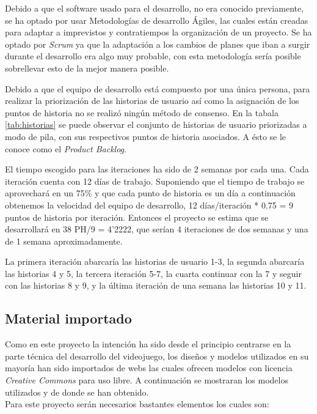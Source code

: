 Debido a que el software usado para el desarrollo, no era conocido previamente, se ha optado por usar Metodologías de desarrollo Ágiles, las cuales están creadas para adaptar a imprevistos y contratiempos la organización de un proyecto. Se ha optado por \textit{Scrum} ya que la adaptación a los cambios de planes que iban a surgir durante el desarrollo era algo muy probable, con esta metodología sería posible sobrellevar esto de la mejor manera posible.

Debido a que el equipo de desarrollo está compuesto por una única persona, para realizar la priorización de las historias de usuario así como la asignación de los puntos de historia no se realizó ningún método de consenso. En la tabala \ref{tab:historias} se puede observar el conjunto de historias de usuario priorizadas a modo de pila, con sus respectivos puntos de historia asociados. A ésto se le conoce como el \textit{Product Backlog}.

El tiempo escogido para las iteraciones ha sido de 2 semanas por cada una. Cada iteración cuenta con 12 días de trabajo. Suponiendo que el tiempo de trabajo se aprovechará en un 75\% y que cada punto de historia es un día a continuación obtenemos la velocidad del equipo de desarrollo, 12 días/iteración * 0.75 =  9 puntos de historia por iteración. Entonces el proyecto se estima que se desarrollará en 38 PH/9 = 4'2222, que serían 4 iteraciones de dos semanas y una de 1 semana aproximadamente.

La primera iteración abarcaría las historias de usuario 1-3, la segunda abarcaría las historias 4 y 5, la tercera iteración 5-7, la cuarta continuar con la 7 y seguir con las historias 8 y 9, y la última iteración de una semana las historias 10 y 11.


\subsection{Material importado}

Como en este proyecto la intención ha sido desde el principio centrarse en la parte técnica del desarrollo
del videojuego, los diseños y modelos utilizados en su mayoría han sido importados de webs las cuales
ofrecen modelos con licencia \textit{Creative Commons} para uso libre. A continuación se mostraran los modelos utilizados 
y de donde se han obtenido.\\
Para este proyecto serán necesarios bastantes elementos los cuales son:

